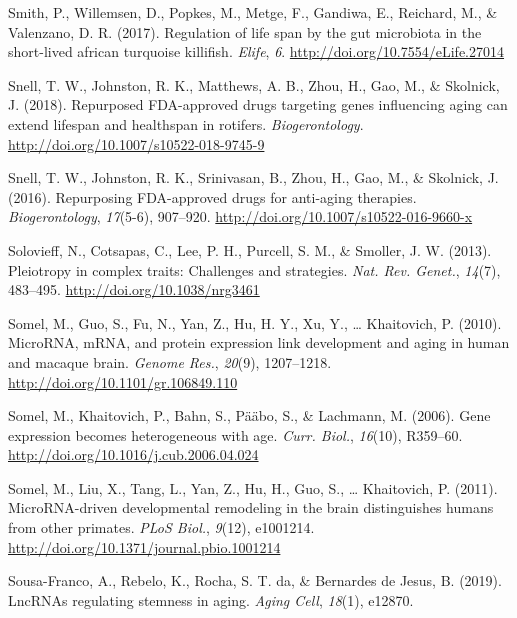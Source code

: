 \documentclass[12pt,twoside]{unicam}
\begin{document}
\begin{cslreferences}
\leavevmode\hypertarget{ref-Smith2017}{}%
Smith, P., Willemsen, D., Popkes, M., Metge, F., Gandiwa, E., Reichard, M., \& Valenzano, D. R. (2017). Regulation of life span by the gut microbiota in the short-lived african turquoise killifish. \emph{Elife}, \emph{6}. \url{http://doi.org/10.7554/eLife.27014}

\leavevmode\hypertarget{ref-Snell2018}{}%
Snell, T. W., Johnston, R. K., Matthews, A. B., Zhou, H., Gao, M., \& Skolnick, J. (2018). Repurposed FDA-approved drugs targeting genes influencing aging can extend lifespan and healthspan in rotifers. \emph{Biogerontology}. \url{http://doi.org/10.1007/s10522-018-9745-9}

\leavevmode\hypertarget{ref-Snell2016}{}%
Snell, T. W., Johnston, R. K., Srinivasan, B., Zhou, H., Gao, M., \& Skolnick, J. (2016). Repurposing FDA-approved drugs for anti-aging therapies. \emph{Biogerontology}, \emph{17}(5-6), 907--920. \url{http://doi.org/10.1007/s10522-016-9660-x}

\leavevmode\hypertarget{ref-Solovieff2013}{}%
Solovieff, N., Cotsapas, C., Lee, P. H., Purcell, S. M., \& Smoller, J. W. (2013). Pleiotropy in complex traits: Challenges and strategies. \emph{Nat. Rev. Genet.}, \emph{14}(7), 483--495. \url{http://doi.org/10.1038/nrg3461}

\leavevmode\hypertarget{ref-Somel2010}{}%
Somel, M., Guo, S., Fu, N., Yan, Z., Hu, H. Y., Xu, Y., \ldots{} Khaitovich, P. (2010). MicroRNA, mRNA, and protein expression link development and aging in human and macaque brain. \emph{Genome Res.}, \emph{20}(9), 1207--1218. \url{http://doi.org/10.1101/gr.106849.110}

\leavevmode\hypertarget{ref-Somel2006}{}%
Somel, M., Khaitovich, P., Bahn, S., Pääbo, S., \& Lachmann, M. (2006). Gene expression becomes heterogeneous with age. \emph{Curr. Biol.}, \emph{16}(10), R359--60. \url{http://doi.org/10.1016/j.cub.2006.04.024}

\leavevmode\hypertarget{ref-Somel2011}{}%
Somel, M., Liu, X., Tang, L., Yan, Z., Hu, H., Guo, S., \ldots{} Khaitovich, P. (2011). MicroRNA-driven developmental remodeling in the brain distinguishes humans from other primates. \emph{PLoS Biol.}, \emph{9}(12), e1001214. \url{http://doi.org/10.1371/journal.pbio.1001214}

\leavevmode\hypertarget{ref-Sousa-Franco2019}{}%
Sousa-Franco, A., Rebelo, K., Rocha, S. T. da, \& Bernardes de Jesus, B. (2019). LncRNAs regulating stemness in aging. \emph{Aging Cell}, \emph{18}(1), e12870.


\end{cslreferences}
\end{document}
